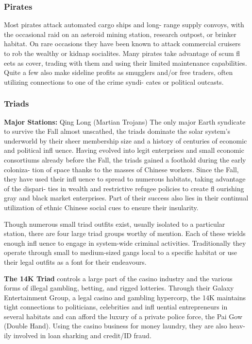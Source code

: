 \subsubsection{Pirates}

Most pirates attack automated cargo ships and long-
range supply convoys, with the occasional raid on an 
asteroid mining station, research outpost, or brinker 
habitat. On rare occasions they have been known 
to attack commercial cruisers to rob the wealthy or 
kidnap socialites. Many pirates take advantage of 
scum fl eets as cover, trading with them and using their 
limited maintenance capabilities. Quite a few also 
make sideline profits as smugglers and/or free traders, 
often utilizing connections to one of the crime syndi-
cates or political outcasts.

\subsubsection{Triads}

\textbf{Major Stations: }Qing Long (Martian Trojans)
The only major Earth syndicate to survive the Fall 
almost unscathed, the triads dominate the solar 
system's underworld by their sheer membership size 
and a history of centuries of economic and political 
infl uence. Having evolved into legit enterprises and 
small economic consortiums already before the Fall, 
the triads gained a foothold during the early coloniza-
tion of space thanks to the masses of Chinese workers. 
Since the Fall, they have used their infl uence to spread 
to numerous habitats, taking advantage of the dispari-
ties in wealth and restrictive refugee policies to create 
fl ourishing gray and black market enterprises. Part of 
their success also lies in their continual utilization of 
ethnic Chinese social cues to ensure their insularity.

Though numerous small triad outfits exist, usually 
isolated to a particular station, there are four large 
triad groups worthy of mention. Each of these wields 
enough infl uence to engage in system-wide criminal 
activities. Traditionally they operate through small to 
medium-sized gangs local to a specific habitat or use 
their legal outfits as a font for their endeavours.

\textbf{The 14K Triad} controls a large part of the casino 
industry and the various forms of illegal gambling, 
betting, and rigged lotteries. Through their Galaxy 
Entertainment Group, a legal casino and gambling 
hypercorp, the 14K maintains tight connections to 
politicians, celebrities and infl uential entrepreneurs in 
several habitats and can afford the luxury of a private 
police force, the Pai Gow (Double Hand). Using the 
casino business for money laundry, they are also heav-
ily involved in loan sharking and credit/ID fraud.

